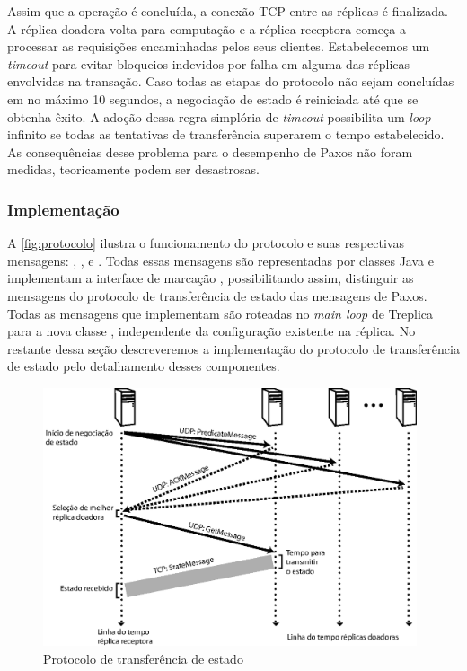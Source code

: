 Assim que a operação é concluída, a conexão TCP entre as réplicas é finalizada. A réplica
doadora volta para computação e a réplica receptora começa a processar as requisições
encaminhadas pelos seus clientes. Estabelecemos um \emph{timeout} para evitar bloqueios
indevidos por falha em alguma das réplicas envolvidas na transação. Caso todas as etapas
do protocolo não sejam concluídas em no máximo 10 segundos, a negociação de estado é
reiniciada até que se obtenha êxito. A adoção dessa regra simplória de \emph{timeout}
possibilita um \emph{loop} infinito se todas as tentativas de transferência superarem o
tempo estabelecido. As consequências desse problema para o desempenho de Paxos não foram
medidas, teoricamente podem ser desastrosas.

\subsubsection{Implementação}

A \autoref{fig:protocolo} ilustra o funcionamento do protocolo e suas respectivas
mensagens: , ,  e
. Todas essas mensagens são representadas por classes Java e
implementam a interface de marcação , possibilitando
assim, distinguir as mensagens do protocolo de transferência de estado das mensagens de
Paxos. Todas as mensagens que implementam  são roteadas no
\emph{main loop} de Treplica para a nova classe , independente da
configuração existente na réplica. No restante dessa seção descreveremos a implementação
do protocolo de transferência de estado pelo detalhamento desses componentes.

\begin{figure}[ht]
  \centering
  \includegraphics[width=11cm]{conteudo/capitulos/figuras/transferencia_estado.eps}
  \caption{Protocolo de transferência de estado}
  \label{fig:protocolo}
\end{figure}

